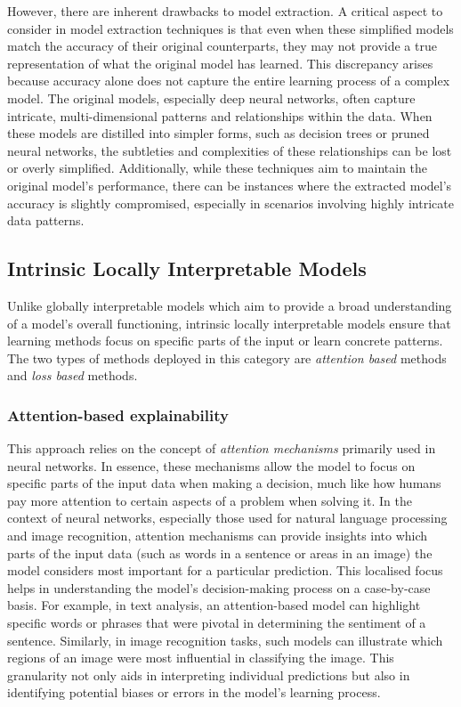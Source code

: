 However, there are inherent drawbacks to model extraction. A critical aspect to consider in model extraction techniques is that even when these simplified models match the accuracy of their original counterparts, they may not provide a true representation of what the original model has learned. This discrepancy arises because accuracy alone does not capture the entire learning process of a complex model. The original models, especially deep neural networks, often capture intricate, multi-dimensional patterns and relationships within the data. When these models are distilled into simpler forms, such as decision trees or pruned neural networks, the subtleties and complexities of these relationships can be lost or overly simplified. Additionally, while these techniques aim to maintain the original model's performance, there can be instances where the extracted model's accuracy is slightly compromised, especially in scenarios involving highly intricate data patterns.


\subsection{Intrinsic Locally Interpretable Models}

Unlike globally interpretable models which aim to provide a broad understanding of a model's overall functioning, intrinsic locally interpretable models ensure that learning methods focus on specific parts of the input or learn concrete patterns. The two types of methods deployed in this category are \emph{attention based} methods and \emph{loss based} methods.


\subsubsection{Attention-based explainability}

This approach relies on the concept of \textit{attention mechanisms} primarily used in neural networks. In essence, these mechanisms allow the model to focus on specific parts of the input data when making a decision, much like how humans pay more attention to certain aspects of a problem when solving it. In the context of neural networks, especially those used for natural language processing and image recognition, attention mechanisms can provide insights into which parts of the input data (such as words in a sentence or areas in an image) the model considers most important for a particular prediction. This localised focus helps in understanding the model's decision-making process on a case-by-case basis. For example, in text analysis, an attention-based model can highlight specific words or phrases that were pivotal in determining the sentiment of a sentence. Similarly, in image recognition tasks, such models can illustrate which regions of an image were most influential in classifying the image. This granularity not only aids in interpreting individual predictions but also in identifying potential biases or errors in the model's learning process.

